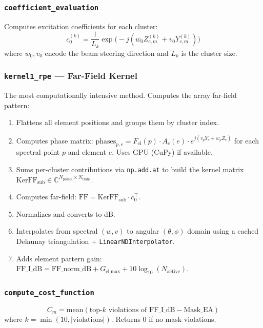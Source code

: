 \documentclass[11pt,a4paper]{article}
\begin{document}
\subsubsection{\texttt{coefficient\_evaluation}}
Computes excitation coefficients for each cluster:
\[
    c_0^{(k)} = \frac{1}{L_k} \exp\!\bigl(-j(w_0 Z_{c,m}^{(k)} + v_0 Y_{c,m}^{(k)})\bigr)
\]
where $w_0, v_0$ encode the beam steering direction and $L_k$ is the cluster size.

\subsubsection{\texttt{kernel1\_rpe} --- Far-Field Kernel}

The most computationally intensive method. Computes the array far-field pattern:

\begin{enumerate}
    \item Flattens all element positions and groups them by cluster index.
    \item Computes phase matrix: $\text{phases}_{p,e} = F_{\text{el}}(p) \cdot A_c(e) \cdot
          e^{j(v_p Y_e + w_p Z_e)}$ for each spectral point $p$ and element $e$.
          Uses GPU (CuPy) if available.
    \item Sums per-cluster contributions via \texttt{np.add.at} to build the kernel matrix
          $\text{KerFF}_{\text{sub}} \in \mathbb{C}^{N_{\text{points}} \times N_{\text{trans}}}$.
    \item Computes far-field: $\text{FF} = \text{KerFF}_{\text{sub}} \cdot c_0^\top$.
    \item Normalizes and converts to dB.
    \item Interpolates from spectral $(w, v)$ to angular $(\theta, \phi)$ domain
          using a cached Delaunay triangulation + \texttt{LinearNDInterpolator}.
    \item Adds element pattern gain:
          $\text{FF\_I\_dB} = \text{FF\_norm\_dB} + G_{\text{el,max}} + 10\log_{10}(N_{\text{active}})$.
\end{enumerate}

\subsubsection{\texttt{compute\_cost\_function}}
\[
    C_m = \text{mean}(\text{top-}k\text{ violations of } \text{FF\_I\_dB} - \text{Mask\_EA})
\]
where $k = \min(10, |\text{violations}|)$. Returns $0$ if no mask violations.
\end{document}
